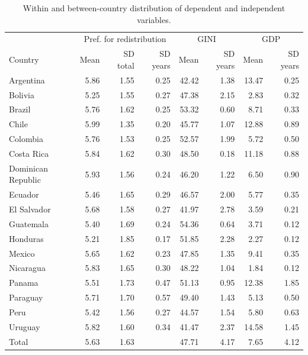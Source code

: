 \documentclass[utf8]{frontiersSCNS} %
\begin{document}
\begin{table}[h]
\centering
	\caption{Within and between-country distribution of dependent and independent variables.}
	\label{appendix2}
    \renewcommand{\arraystretch}{0.8}
\begin{tabular}{lrrrrrrr}
  \toprule
	 & \multicolumn{3}{c}{Pref. for redistribution} & \multicolumn{2}{c}{GINI} & \multicolumn{2}{c}{GDP} \\
    Country & Mean & SD total & SD years & Mean & SD years & Mean & SD years \\
  \midrule
  Argentina & 5.86 & 1.55 & 0.25 & 42.42 & 1.38 & 13.47 & 0.25 \\ 
  Bolivia & 5.25 & 1.55 & 0.27 & 47.38 & 2.15 & 2.83 & 0.32 \\ 
  Brazil & 5.76 & 1.62 & 0.25 & 53.32 & 0.60 & 8.71 & 0.33 \\ 
  Chile & 5.99 & 1.35 & 0.20 & 45.77 & 1.07 & 12.88 & 0.89 \\ 
  Colombia & 5.76 & 1.53 & 0.25 & 52.57 & 1.99 & 5.72 & 0.50 \\ 
  Costa Rica & 5.84 & 1.62 & 0.30 & 48.50 & 0.18 & 11.18 & 0.88 \\ 
  Dominican Republic & 5.93 & 1.56 & 0.24 & 46.20 & 1.22 & 6.50 & 0.90 \\ 
  Ecuador & 5.46 & 1.65 & 0.29 & 46.57 & 2.00 & 5.77 & 0.35 \\ 
  El Salvador & 5.68 & 1.58 & 0.27 & 41.97 & 2.78 & 3.59 & 0.21 \\ 
  Guatemala & 5.40 & 1.69 & 0.24 & 54.36 & 0.64 & 3.71 & 0.12 \\ 
  Honduras & 5.21 & 1.85 & 0.17 & 51.85 & 2.28 & 2.27 & 0.12 \\ 
  Mexico & 5.65 & 1.62 & 0.23 & 47.85 & 1.35 & 9.41 & 0.35 \\ 
  Nicaragua & 5.83 & 1.65 & 0.30 & 48.22 & 1.04 & 1.84 & 0.12 \\ 
  Panama & 5.51 & 1.73 & 0.47 & 51.13 & 0.95 & 12.38 & 1.85 \\ 
  Paraguay & 5.71 & 1.70 & 0.57 & 49.40 & 1.43 & 5.13 & 0.50 \\ 
  Peru & 5.42 & 1.56 & 0.27 & 44.57 & 1.54 & 5.80 & 0.63 \\ 
  Uruguay & 5.82 & 1.60 & 0.34 & 41.47 & 2.37 & 14.58 & 1.45 \\ 
  Total & 5.63 & 1.63 &  & 47.71 & 4.17 & 7.65 & 4.12 \\ 
		\bottomrule
	\end{tabular}
\end{table}
\end{document}
